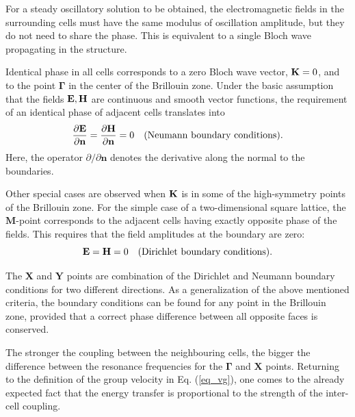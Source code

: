 For a steady oscillatory solution to be obtained, the electromagnetic fields in the surrounding cells must have the same modulus of oscillation amplitude, but they do not need to share the phase. This is equivalent to a single Bloch wave propagating in the structure. 

Identical phase in all cells corresponds to a zero Bloch wave vector, ${\mathbf{K}} = 0$, and to the point $\mathbf{\Gamma}$ in the center of the Brillouin zone. Under the basic assumption that the fields $\mathbf{E}, \mathbf{H}$ are continuous and smooth vector functions, the requirement of an identical phase of adjacent cells translates into
\begin{equation} \frac{\partial \mathbf{E}}{\partial\mathbf{n}} = \frac{\partial \mathbf{H}}{\partial\mathbf{n}} = 0 \quad\text{(Neumann boundary conditions).} \label{eq_bcond_neumann}\end{equation} 
Here, the operator $\partial/\partial \mathbf{n}$ denotes the derivative along the normal to the boundaries.

Other special cases are observed when ${\mathbf{K}}$ is in some of the high-symmetry points of the Brillouin zone. For the simple case of a two-dimensional square lattice, the $\mathbf{M}$-point corresponds to the adjacent cells having exactly opposite phase of the fields. This requires that the field amplitudes at the boundary are zero:
\begin{equation} \mathbf{E} = \mathbf{H} = 0 \quad\text{(Dirichlet boundary conditions).} \label{eq_bcond_dirichlet}\end{equation} 

The $\mathbf{X}$ and $\mathbf{Y}$ points are combination of the Dirichlet and Neumann boundary conditions for two different directions.
As a generalization of the above mentioned criteria, the boundary conditions can be found for any point in the Brillouin zone, provided that a correct phase difference between all opposite faces is conserved.

The stronger the coupling between the neighbouring cells, the bigger the difference between the resonance frequencies for the $\mathbf{\Gamma}$ and $\mathbf{X}$ points. Returning to the definition of the group velocity in Eq. (\ref{eq_vg}), one comes to the already expected fact that the energy transfer is proportional to the strength of the inter-cell coupling.


